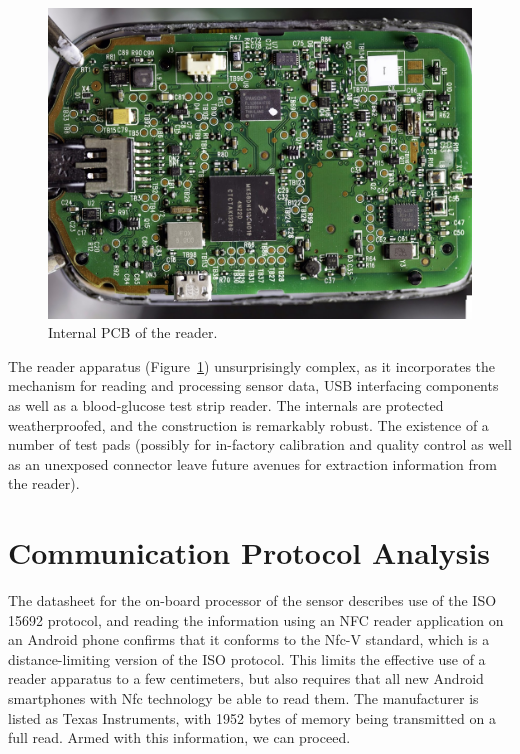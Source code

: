\begin{figure}[ht]
\centering\includegraphics[width=1.0\linewidth]{images/libre5}
\caption{Internal PCB of the reader\cite{noauthor_type_nodate}.}
\label{fig:libre3}
\end{figure}

The reader apparatus (Figure~\ref{fig:libre3}) unsurprisingly complex, as it incorporates the mechanism for reading and processing sensor data, USB interfacing components as well as a blood-glucose test strip reader. The internals are protected weatherproofed, and the construction is remarkably robust. The existence of a number of test pads (possibly for in-factory calibration and quality control as well as an unexposed connector leave future avenues for extraction information from the reader).

\section{Communication Protocol Analysis}

The datasheet\cite{noauthor_rf430frl152h_nodate} for the on-board processor of the sensor describes use of the ISO 15692\cite{noauthor_iso/iec_2017} protocol, and reading the information using an NFC reader application on an Android phone confirms that it conforms to the Nfc-V\cite{noauthor_nfcv_nodate} standard, which is a distance-limiting version of the ISO protocol. This limits the effective use of a reader apparatus to a few centimeters\cite{noauthor_nfc_nodate}, but also requires that all new Android smartphones with Nfc technology be able to read them. The manufacturer is listed as Texas Instruments, with 1952 bytes of memory being transmitted on a full read. Armed with this information, we can proceed.

